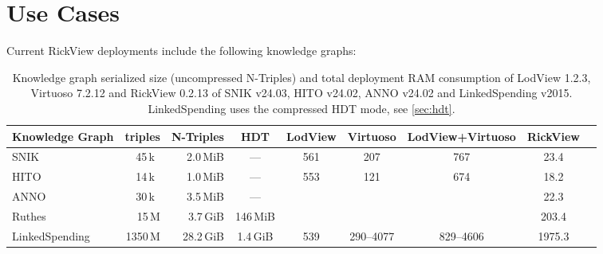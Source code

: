 \documentclass{ceurart}
\begin{document}
\section{Use Cases}
Current RickView deployments include the following knowledge graphs:

\begin{table}
\begin{tabular}{lrrcSSSSS}
\toprule
Knowledge Graph	&\textnormal{triples}		&\textnormal{N-Triples}	&\textnormal{HDT}	&\textnormal{LodView}	&\textnormal{Virtuoso}	&\textnormal{LodView+Virtuoso}	&\textnormal{RickView}\\
\midrule
SNIK	 		&45\,k~						&2.0\,MiB				& ---				&561					&207					&767							&23.4\\
HITO 			&14\,k~						&1.0\,MiB				& ---				&553					&121					&674							&18.2\\
ANNO			&30\,k~						&3.5\,MiB				& ---				&						&						&								&22.3\\
Ruthes			&15\,M						&3.7\,GiB				&146\,MiB			&						&						&								&203.4\\
LinkedSpending	&1350\,M					&28.2\,GiB				&1.4\,GiB			&539					&290--4077				&829--4606						&1975.3\\
\bottomrule
\end{tabular}
\label{tab:stats}
\caption{Knowledge graph serialized size (uncompressed N-Triples) and total deployment RAM consumption of LodView 1.2.3, Virtuoso 7.2.12 and RickView 0.2.13 of SNIK v24.03, HITO v24.02, ANNO v24.02 and LinkedSpending v2015.
LinkedSpending uses the compressed HDT mode, see \cref{sec:hdt}.
}
\end{table}
\end{document}
